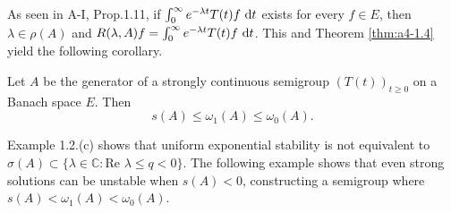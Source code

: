 As seen in A-I, Prop.1.11, if $\int_0^\infty e^{-\lambda t} T(t) f \,\mathop{}\!\mathrm{d}{t}$ exists for every $f \in E$, then $\lambda \in \rho(A)$ and $R(\lambda, A) f = \int_0^\infty e^{-\lambda t} T(t) f \,\mathop{}\!\mathrm{d}{t}$. 
This and Theorem \ref{thm:a4-1.4} yield the following corollary.
\begin{corollary} \label{cor:a4-1.5} Let $ A $ be the generator of a strongly continuous semigroup $ (T(t))_{t \geq 0} $ on a Banach space $ E $. 
Then  
\[
s(A) \leq \omega_1(A) \leq \omega_0(A).
\]
\end{corollary}


 Example 1.2.(c) shows that uniform exponential stability is not equivalent to $ \sigma(A) \subset \{\lambda \in \mathbb{C} : \text{Re } \lambda \leq q < 0 \} $. 
The following example shows that even strong solutions can be unstable when $ s(A) < 0 $, constructing a semigroup where $ s(A) < \omega_1(A) < \omega_0(A) $.

